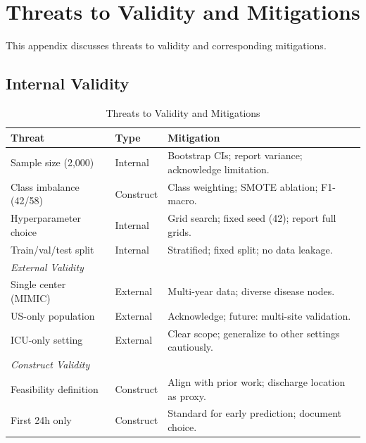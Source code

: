 \chapter{Threats to Validity and Mitigations}
\label{app:threats}

This appendix discusses threats to validity and corresponding mitigations.

\section{Internal Validity}

\begin{table}[h]
\centering
\caption{Threats to Validity and Mitigations}
\begin{tabular}{p{3.5cm}p{2.5cm}p{6cm}}
\toprule
Threat & Type & Mitigation \\
\midrule
Sample size (2,000) & Internal & Bootstrap CIs; report variance; acknowledge limitation. \\
Class imbalance (42/58) & Construct & Class weighting; SMOTE ablation; F1-macro. \\
Hyperparameter choice & Internal & Grid search; fixed seed (42); report full grids. \\
Train/val/test split & Internal & Stratified; fixed split; no data leakage. \\
\midrule
\multicolumn{3}{l}{\textit{External Validity}} \\
\midrule
Single center (MIMIC) & External & Multi-year data; diverse disease nodes. \\
US-only population & External & Acknowledge; future: multi-site validation. \\
ICU-only setting & External & Clear scope; generalize to other settings cautiously. \\
\midrule
\multicolumn{3}{l}{\textit{Construct Validity}} \\
\midrule
Feasibility definition & Construct & Align with prior work; discharge location as proxy. \\
First 24h only & Construct & Standard for early prediction; document choice. \\
\bottomrule
\end{tabular}
\label{tab:threats_full}
\end{table}

